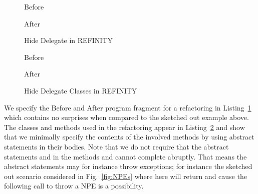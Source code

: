 \begin{figure}[tbp]
  \captionsetup{type=lstlisting}
  \centering
  \begin{sublstlisting}[b]{.455\linewidth}
    
    \caption{Before}
    \label{lst:HideDelegate-nofields-before-refinity}
  \end{sublstlisting}\hspace{1cm}
  \begin{sublstlisting}[b]{.455\linewidth}
    
    \caption{After}
    \label{lst:HideDelegate-nofields-after-refinity}
  \end{sublstlisting}
\caption{Hide Delegate in REFINITY}
\label{lst:HideDelegate-nofields-refinity}
\end{figure}

\begin{figure}[tbp]
  \captionsetup{type=lstlisting}
  \centering
  \begin{sublstlisting}[b]{.4\linewidth}
    
    \caption{Before}
    \label{lst:HideDelegate-nofields-resource-refinity}
  \end{sublstlisting}\hspace{1cm}
  \begin{sublstlisting}[b]{.4\linewidth}
    
    \caption{After}
    \label{lst:HideDelegate-nofields-owner-refinity}
  \end{sublstlisting}
\caption{Hide Delegate Classes in REFINITY}
\label{lst:HideDelegate-nofields-classes-refinity}
\end{figure}
We specify the Before and After program fragment for a  refactoring in Listing~\ref{lst:HideDelegate-nofields-refinity} which contains no surprises when compared to the sketched out example above.
The classes and methods used in the refactoring appear in Listing~\ref{lst:HideDelegate-nofields-classes-refinity} and show that we minimally specify the contents of the involved methods by using abstract
statements in their bodies.
Note that we do not require that the abstract statements  and  in the methods  and  cannot complete abruptly.
That means the abstract statements may for instance throw exceptions; for instance the sketched out scenario considered in Fig.~\ref{fig:NPEs} where here  will return  and cause the following call to throw a NPE is a possibility.

